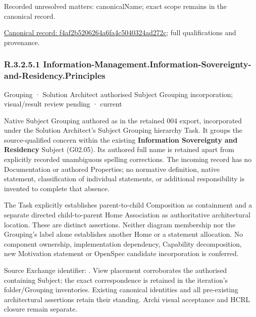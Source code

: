 {\small Recorded unresolved matters: canonicalName; exact scope remains in the canonical record.}\par
{\footnotesize \href{../../../../continuum/grouping/f4af2b5206264a6fa4c5040324ad272c.md}{Canonical record: f4af2b5206264a6fa4c5040324ad272c}; full qualifications and provenance.}\par
\subsubsection*{R.3.2.5.1 Information-Management.Information-Sovereignty-and-Residency.Principles}
\label{navigation:R.3.2.5.1}

\label{element:f6b8d4c19f9649a0bdde6727182855b6}
{\small Grouping · Solution Architect authorised Subject Grouping incorporation; visual/result review pending · current}\par

Native Subject Grouping authored as \texttt{} in the retained 004 export,
incorporated under the Solution Architect's Subject Grouping hierarchy Task.
It groups the source-qualified \texttt{} concern within
the existing \textbf{Information Sovereignty and Residency} Subject (G02.05). Its authored full name
is retained apart from explicitly recorded unambiguous spelling corrections.
The incoming record has no Documentation or authored Properties; no normative
definition, native statement, classification of individual statements, or
additional responsibility is invented to complete that absence.



The Task explicitly establishes parent-to-child Composition as containment and
a separate directed child-to-parent Home Association as authoritative architectural
location. These are distinct assertions. Neither diagram membership nor the
Grouping's label alone establishes another Home or a statement allocation.
No component ownership, implementation dependency, Capability decomposition,
new Motivation statement or OpenSpec candidate incorporation is conferred.



Source Exchange identifier: \texttt{}. View placement corroborates
the authorised containing Subject; the exact correspondence is retained in the
iteration's folder/Grouping inventories. Existing canonical identities and all
pre-existing architectural assertions retain their standing. Archi visual
acceptance and HCRL closure remain separate.


